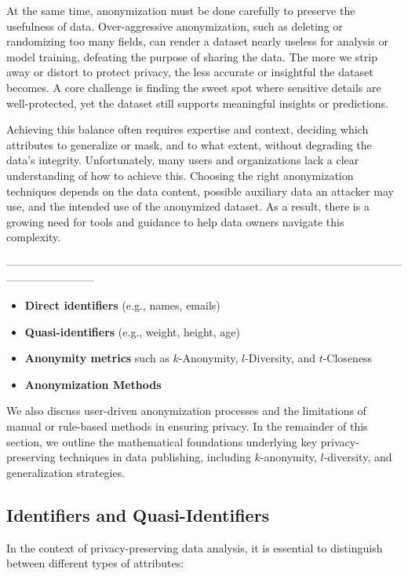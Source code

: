 \documentclass{article}
\begin{document}
At the same time, anonymization must be done carefully to preserve the usefulness of data. Over-aggressive anonymization, such as deleting or randomizing too many fields, can render a dataset nearly useless for analysis or model training, defeating the purpose of sharing the data. The more we strip away or distort to protect privacy, the less accurate or insightful the dataset becomes. A core challenge is finding the sweet spot where sensitive details are well-protected, yet the dataset still supports meaningful insights or predictions.

Achieving this balance often requires expertise and context, deciding which attributes to generalize or mask, and to what extent, without degrading the data’s integrity. Unfortunately, many users and organizations lack a clear understanding of how to achieve this. Choosing the right anonymization techniques depends on the data content, possible auxiliary data an attacker may use, and the intended use of the anonymized dataset. As a result, there is a growing need for tools and guidance to help data owners navigate this complexity.

------------------------------------------------------------------------------------------------------------------------------------

\begin{itemize}
\item \textbf{Direct identifiers} (e.g., names, emails)
\item \textbf{Quasi-identifiers} (e.g., weight, height, age)
\item \textbf{Anonymity metrics} such as $k$-Anonymity, $l$-Diversity, and $t$-Closeness
\item \textbf{Anonymization Methods}
\end{itemize}

We also discuss user-driven anonymization processes and the limitations of manual or rule-based methods in ensuring privacy. In the remainder of this section, we outline the mathematical foundations underlying key privacy-preserving techniques in data publishing, including $k$-anonymity, $l$-diversity, and generalization strategies.

\subsection{Identifiers and Quasi-Identifiers}

In the context of privacy-preserving data analysis, it is essential to distinguish between different types of attributes:
\end{document}
